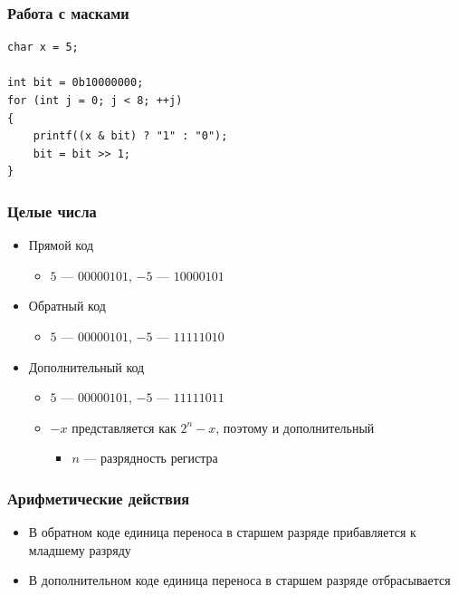 \documentclass[xetex,mathserif,serif]{beamer}
\begin{document}
	\begin{frame}[fragile]
		\frametitle{Работа с масками}
		\begin{footnotesize}
			\begin{verbatim}
char x = 5;

int bit = 0b10000000;
for (int j = 0; j < 8; ++j)
{
    printf((x & bit) ? "1" : "0");
    bit = bit >> 1;
}
			\end{verbatim}
		\end{footnotesize}
	\end{frame}

	\begin{frame}
		\frametitle{Целые числа}
		\begin{itemize}
			\item Прямой код
			\begin{itemize}
				\item $5$ --- $00000101$, $-5$ --- $10000101$
			\end{itemize}
			\item Обратный код
			\begin{itemize}
				\item $5$ --- $00000101$, $-5$ --- $11111010$
			\end{itemize}
			\item Дополнительный код
			\begin{itemize}
				\item $5$ --- $00000101$, $-5$ --- $11111011$
				\item $-x$ представляется как $2^n - x$, поэтому и дополнительный
				\begin{itemize}
					\item $n$ --- разрядность регистра
				\end{itemize} 
			\end{itemize}
		\end{itemize}
	\end{frame}

	\begin{frame}
		\frametitle{Арифметические действия}
		\begin{itemize}
			\item В обратном коде единица переноса в старшем разряде прибавляется к младшему разряду
			\item В дополнительном коде единица переноса в старшем разряде отбрасывается
		\end{itemize}
	\end{frame}
\end{document}
